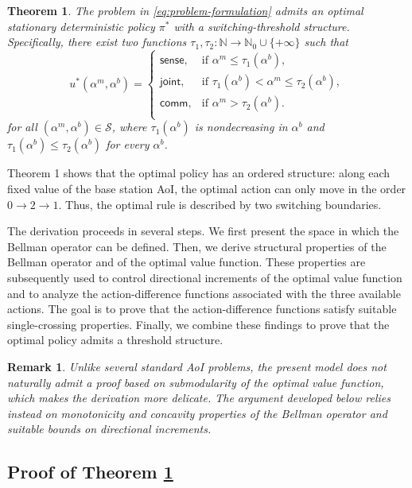 \documentclass[letterpaper,journal]{IEEEtran}
\newtheorem{theorem}{Theorem}
\newtheorem*{remark}{Remark}
\begin{document}
\begin{theorem}\label{th:policy-structure}
The problem in \eqref{eq:problem-formulation} admits an optimal stationary deterministic policy $\pi^*$ with a switching-threshold structure. Specifically, there exist two functions $\tau_1, \tau_2 : \mathbb{N}\rightarrow\mathbb{N}_0\cup\{+\infty\}$ such that
\[
u^*(\alpha^m,\alpha^b)=
\begin{cases}
	\mathsf{sense,} & \text{if } \alpha^m\leq\tau_1(\alpha^b),\\
	\mathsf{joint,} & \text{if } \tau_1(\alpha^b)<\alpha^m\leq\tau_2(\alpha^b),\\
	\mathsf{comm,} & \text{if } \alpha^m>\tau_2(\alpha^b).\\
\end{cases}
\]
for all $(\alpha^m,\alpha^b)\in\mathcal{S}$, where $\tau_1(\alpha^b)$ is nondecreasing in $\alpha^b$ and $\tau_1(\alpha^b)\leq\tau_2(\alpha^b)$ for every $\alpha^b$.
\end{theorem}

Theorem 1 shows that the optimal policy has an ordered structure: along each fixed value of the base station AoI, the optimal action can only move in the order $0 \to 2 \to 1$. Thus, the optimal rule is described by two switching boundaries.

The derivation proceeds in several steps. We first present the space in which the Bellman operator can be defined. Then, we derive structural properties of the Bellman operator and of the optimal value function. These properties are subsequently used to control directional increments of the optimal value function and to analyze the action-difference functions associated with the three available actions. The goal is to prove that the action-difference functions satisfy suitable single-crossing properties. Finally, we combine these findings to prove that the optimal policy admits a threshold structure.

\begin{remark}
Unlike several standard AoI problems, the present model does not naturally admit a proof based on submodularity of the optimal value function, which makes the derivation more delicate. The argument developed below relies instead on monotonicity and concavity properties of the Bellman operator and suitable bounds on directional increments.
\end{remark}



\subsection{Proof of Theorem \ref{th:policy-structure}}
\end{document}
